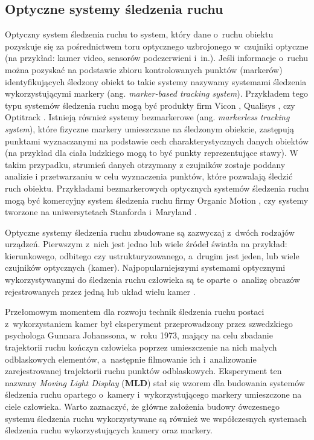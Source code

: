 \subsection{Optyczne systemy śledzenia ruchu}
Optyczny system śledzenia ruchu to system, który dane o~ruchu obiektu pozyskuje się za pośrednictwem toru optycznego uzbrojonego w~czujniki optyczne (na przykład: kamer video, sensorów podczerwieni i~in.). Jeśli informacje o~ruchu można pozyskać na podstawie zbioru kontrolowanych punktów (markerów) identyfikujących śledzony obiekt to takie systemy nazywamy systemami śledzenia wykorzystującymi markery (ang. \textsl{marker-based tracking system}). Przykładem tego typu systemów śledzenia ruchu mogą być produkty firm Vicon , Qualisys , czy Optitrack . Istnieją również systemy bezmarkerowe (ang. \textsl{markerless tracking system}), które fizyczne markery umieszczane na śledzonym obiekcie, zastępują punktami wyznaczanymi na podstawie cech charakterystycznych danych obiektów (na przykład dla ciała ludzkiego mogą to być punkty reprezentujące stawy). W takim przypadku, strumień danych otrzymany z czujników zostaje poddany analizie i przetwarzaniu w celu wyznaczenia punktów, które pozwalają śledzić ruch obiektu. Przykładami bezmarkerowych optycznych systemów śledzenia ruchu mogą być komercyjny system śledzenia ruchu firmy Organic Motion , czy systemy tworzone na uniwersytetach Stanforda  i~Maryland \cite{Sundaresan2005,Sundaresan2007}.

Optyczne systemy śledzenia ruchu zbudowane są zazwyczaj z~dwóch rodzajów urządzeń. Pierwszym z~nich jest jedno lub wiele źródeł światła na przykład: kierunkowego, odbitego czy ustrukturyzowanego, a~drugim jest jeden, lub wiele czujników optycznych (kamer). Najpopularniejszymi systemami optycznymi wykorzystywanymi do śledzenia ruchu człowieka są te oparte o~analizę obrazów rejestrowanych przez jedną \cite{schmidt2006kernel,RuiLi2006} lub układ wielu kamer  \cite{Sundaresan2005,Krzeszowski2013}.

Przełomowym momentem dla rozwoju technik śledzenia ruchu postaci z~wykorzystaniem kamer był eksperyment przeprowadzony przez szwedzkiego psychologa Gunnara Johanssona, w~roku 1973, mający na celu zbadanie trajektorii ruchu kończyn człowieka poprzez umieszczenie na nich małych odblaskowych elementów, a~następnie filmowanie ich i~analizowanie zarejestrowanej trajektorii ruchu punktów odblaskowych. Eksperyment ten nazwany \emph{Moving Light Display} (\textbf{MLD}) \cite{Johansson1973} stał się wzorem dla budowania systemów śledzenia ruchu opartego o~kamery i~wykorzystującego markery umieszczone na ciele człowieka. Warto zaznaczyć, że główne założenia budowy ówczesnego systemu śledzenia ruchu wykorzystywane są również we współczesnych systemach śledzenia ruchu wykorzystujących kamery oraz markery.

